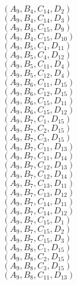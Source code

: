 \documentclass[14pt]{article}
\begin{document}
    $({A}_{9}, {B}_{4}, {C}_{14}, {D}_{2}) $ \\ 
    $({A}_{9}, {B}_{4}, {C}_{14}, {D}_{3}) $ \\ 
    $({A}_{9}, {B}_{4}, {C}_{15}, {D}_{9}) $ \\ 
    $({A}_{9}, {B}_{4}, {C}_{15}, {D}_{10}) $ \\ 
    $({A}_{9}, {B}_{5}, {C}_{4}, {D}_{11}) $ \\ 
    $({A}_{9}, {B}_{5}, {C}_{4}, {D}_{12}) $ \\ 
    $({A}_{9}, {B}_{5}, {C}_{11}, {D}_{4}) $ \\ 
    $({A}_{9}, {B}_{5}, {C}_{12}, {D}_{4}) $ \\ 
    $({A}_{9}, {B}_{6}, {C}_{11}, {D}_{15}) $ \\ 
    $({A}_{9}, {B}_{6}, {C}_{12}, {D}_{15}) $ \\ 
    $({A}_{9}, {B}_{6}, {C}_{15}, {D}_{11}) $ \\ 
    $({A}_{9}, {B}_{6}, {C}_{15}, {D}_{12}) $ \\ 
    $({A}_{9}, {B}_{7}, {C}_{1}, {D}_{15}) $ \\ 
    $({A}_{9}, {B}_{7}, {C}_{2}, {D}_{15}) $ \\ 
    $({A}_{9}, {B}_{7}, {C}_{3}, {D}_{15}) $ \\ 
    $({A}_{9}, {B}_{7}, {C}_{11}, {D}_{13}) $ \\ 
    $({A}_{9}, {B}_{7}, {C}_{11}, {D}_{14}) $ \\ 
    $({A}_{9}, {B}_{7}, {C}_{12}, {D}_{13}) $ \\ 
    $({A}_{9}, {B}_{7}, {C}_{12}, {D}_{14}) $ \\ 
    $({A}_{9}, {B}_{7}, {C}_{13}, {D}_{11}) $ \\ 
    $({A}_{9}, {B}_{7}, {C}_{13}, {D}_{12}) $ \\ 
    $({A}_{9}, {B}_{7}, {C}_{14}, {D}_{11}) $ \\ 
    $({A}_{9}, {B}_{7}, {C}_{14}, {D}_{12}) $ \\ 
    $({A}_{9}, {B}_{7}, {C}_{15}, {D}_{1}) $ \\ 
    $({A}_{9}, {B}_{7}, {C}_{15}, {D}_{2}) $ \\ 
    $({A}_{9}, {B}_{7}, {C}_{15}, {D}_{3}) $ \\ 
    $({A}_{9}, {B}_{8}, {C}_{1}, {D}_{15}) $ \\ 
    $({A}_{9}, {B}_{8}, {C}_{2}, {D}_{15}) $ \\ 
    $({A}_{9}, {B}_{8}, {C}_{3}, {D}_{15}) $ \\ 
    $({A}_{9}, {B}_{8}, {C}_{11}, {D}_{13}) $ \\ 
\end{document}
